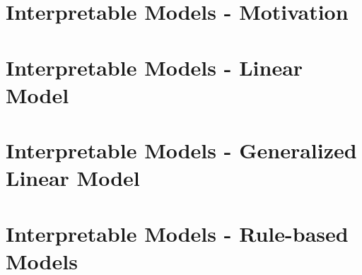 \documentclass[11pt,compress,t,n
otes=noshow, aspectratio=169, xcolor=table]{beamer}
\begin{document}


% 
% 
% 

\section{Interpretable Models - Motivation}


\section{Interpretable Models - Linear Model}



\section{Interpretable Models - Generalized Linear Model}


\section{Interpretable Models - Rule-based Models}
%

\end{document}
